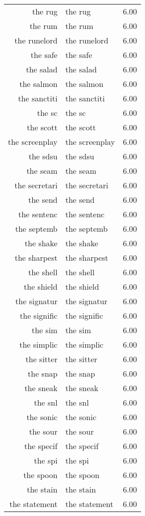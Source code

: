\begin{table}[ht]
\begin{tabular}{rlr}
  the rug & the rug & 6.00 \\ 
  the rum & the rum & 6.00 \\ 
  the runelord & the runelord & 6.00 \\ 
  the safe & the safe & 6.00 \\ 
  the salad & the salad & 6.00 \\ 
  the salmon & the salmon & 6.00 \\ 
  the sanctiti & the sanctiti & 6.00 \\ 
  the sc & the sc & 6.00 \\ 
  the scott & the scott & 6.00 \\ 
  the screenplay & the screenplay & 6.00 \\ 
  the sdsu & the sdsu & 6.00 \\ 
  the seam & the seam & 6.00 \\ 
  the secretari & the secretari & 6.00 \\ 
  the send & the send & 6.00 \\ 
  the sentenc & the sentenc & 6.00 \\ 
  the septemb & the septemb & 6.00 \\ 
  the shake & the shake & 6.00 \\ 
  the sharpest & the sharpest & 6.00 \\ 
  the shell & the shell & 6.00 \\ 
  the shield & the shield & 6.00 \\ 
  the signatur & the signatur & 6.00 \\ 
  the signific & the signific & 6.00 \\ 
  the sim & the sim & 6.00 \\ 
  the simplic & the simplic & 6.00 \\ 
  the sitter & the sitter & 6.00 \\ 
  the snap & the snap & 6.00 \\ 
  the sneak & the sneak & 6.00 \\ 
  the snl & the snl & 6.00 \\ 
  the sonic & the sonic & 6.00 \\ 
  the sour & the sour & 6.00 \\ 
  the specif & the specif & 6.00 \\ 
  the spi & the spi & 6.00 \\ 
  the spoon & the spoon & 6.00 \\ 
  the stain & the stain & 6.00 \\ 
  the statement & the statement & 6.00 \\ 

\end{tabular}
\end{table}
